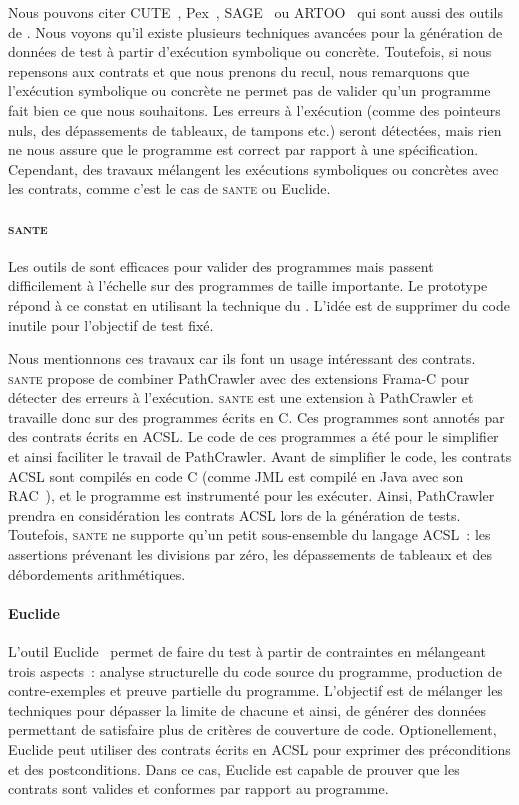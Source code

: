 Nous pouvons citer CUTE~, Pex~,
SAGE~ ou ARTOO~ qui sont aussi des outils
de . Nous voyons qu'il existe plusieurs techniques avancées
pour la génération de données de test à partir d'exécution symbolique ou
concrète. Toutefois, si nous repensons aux contrats et que nous prenons du
recul, nous remarquons que l'exécution symbolique ou concrète ne permet pas de
valider qu'un programme fait bien ce que nous souhaitons. Les erreurs à
l'exécution (comme des pointeurs nuls, des dépassements de tableaux, de tampons
etc.) seront détectées, mais rien ne nous assure que le programme est correct
par rapport à une spécification. Cependant, des travaux mélangent les exécutions
symboliques ou concrètes avec les contrats, comme c'est le cas de {\scshape
sante} ou Euclide.

\paragraph{\scshape sante} Les outils de  sont efficaces
pour valider des programmes mais passent difficilement à l'échelle sur des
programmes de taille importante. Le prototype~~ répond à ce constat en utilisant la technique du
. L'idée est de supprimer du code inutile pour l'objectif de
test fixé.

Nous mentionnons ces travaux car ils font un usage intéressant des contrats.
{\scshape sante} propose de combiner PathCrawler avec des extensions Frama-C
pour détecter des erreurs à l'exécution. {\scshape sante} est une extension à
PathCrawler et travaille donc sur des programmes écrits en C. Ces programmes
sont annotés par des contrats écrits en ACSL. Le code de ces programmes a été
 pour le simplifier et ainsi faciliter le travail de
PathCrawler. Avant de simplifier le code, les contrats ACSL sont compilés en
code C (comme JML est compilé en Java avec son RAC~), et le
programme est instrumenté pour les exécuter. Ainsi, PathCrawler prendra en
considération les contrats ACSL lors de la génération de tests. Toutefois,
{\scshape sante} ne supporte qu'un petit sous-ensemble du langage ACSL~: les
assertions prévenant les divisions par zéro, les dépassements de tableaux et des
débordements arithmétiques.

\paragraph{Euclide} L'outil Euclide~ permet de faire du test à
partir de contrain\-tes en mélangeant trois aspects~: analyse structurelle du
code source du programme, production de contre-exemples et preuve partielle du
programme. L'objectif est de mélanger les techniques pour dépasser la limite de
chacune et ainsi, de générer des données permettant de satisfaire plus de
critères de couverture de code. Optionellement, Euclide peut utiliser des
contrats écrits en ACSL pour exprimer des préconditions et des postconditions.
Dans ce cas, Euclide est capable de prouver que les contrats sont valides et
conformes par rapport au programme.

